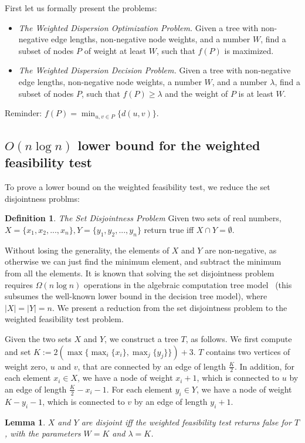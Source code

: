 \documentclass[11pt,a4paper]{article}
\newtheorem{lemma}{Lemma}
\theoremstyle{definition}
\newtheorem{definition}{Definition}
\theoremstyle{remark}
\begin{document}
First let us formally present the problems:
\begin{itemize} 
\item {\em The Weighted Dispersion Optimization Problem.} Given a tree with non-negative edge lengths, non-negative node weights, and a number $W$, find a subset of nodes $P$ of weight at least $W$, such that  $f(P)$ is maximized. 

\item {\em The Weighted Dispersion Decision Problem.} Given a tree with non-negative edge lengths, non-negative node weights, a number $W$, and a number $\lambda$, find a subset of nodes  $P$, such that  $f(P)\geq\lambda$ and the weight of $P$ is at least $W$. 
\end{itemize}

Reminder: $f(P)=\min_{u,v\in P} \{d(u,v)\}$.

\subsection{\boldmath$O(n\log n)$ lower bound for the weighted feasibility test}

To prove a lower bound on the weighted feasibility test, we reduce the set disjointness problms:

\begin{definition} {\em The Set Disjointness Problem}
Given two sets of real numbers, $X=\lbrace x_1,x_2,...,x_n \rbrace, Y=\lbrace y_1,y_2,...,y_n \rbrace$ return true iff $X \cap Y = \emptyset$.
\end{definition}

Without losing the generality, the elements of $X$ and $Y$ are non-negative, as otherwise
we can just find the minimum element, and subtract the minimum from all the elements.
It is known that solving the set disjointness problem requires $\Omega(n \log n)$ operations in the algebraic
computation tree model~\cite{BenOr} (this subsumes the well-known lower bound in the decision tree
model), where $|X|=|Y|=n$.
We present a reduction from the set disjointness problem to the weighted feasibility test problem.

Given the two sets $X$ and $Y$, we construct a tree $T$, as follows. We first compute and set
$K := 2 ( \max \{ \max_i \{ x_i \} , \max_j \{ y_j \} \}) +3$.
$T$ contains two vertices of weight zero, $u$ and $v$, that are connected by an edge of length $\frac{K}{2}$. In addition, for each element $x_i \in X$, we have a node of weight $x_i+1$, which is connected to $u$ by an edge of length $\frac{K}{2} - x_i -1$. For each element $y_i \in Y$, we have a node of weight $K - y_i -1$, which is connected to $v$ by an edge of length $y_i+1$.
\begin{lemma}
$X$ and $Y$ are disjoint iff the weighted feasibility test returns false for $T$, with the parameters $W=K$ and $\lambda =K$.
\end{lemma}
\end{document}
